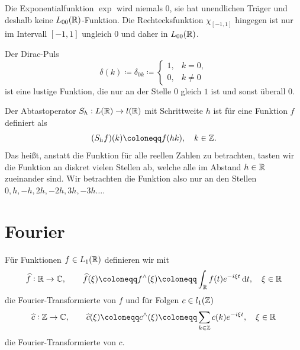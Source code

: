 \begin{example}[$ L_{00}(\R) $-Funktion]
Die Exponentialfunktion $ \exp $ wird niemals $ 0 $, sie hat unendlichen Träger und
deshalb keine $ L_{00}(\R) $-Funktion. Die Rechtecksfunktion $ \chi_{[-1,1]} $ hingegen ist nur
im Intervall $ [-1,1] $ ungleich $ 0 $ und daher in $ L_{00}(\R) $.
\end{example}

\begin{definition}
Der Dirac-Puls
\[
  \delta(k) \coloneqq \delta_{0k} \coloneqq 
  \begin{cases}
    1,& k = 0, \\ 0,& k \neq 0
  \end{cases}
\]
ist eine lustige Funktion, die nur an der Stelle $ 0 $ gleich $ 1 $ ist und sonst überall $ 0 $.
\end{definition}

\begin{definition}[Abtastoperator]
Der Abtastoperator $  S_{h} : L(\mathbb{R}) \rightarrow l(\mathbb{R}) $ mit Schrittweite $ h $ ist für eine
Funktion $ f $ definiert als
\[
  (S_{h}f)(k) \coloneqq f(hk), \quad k \in \Z.
\]
Das heißt, anstatt die Funktion für alle reellen Zahlen zu betrachten, tasten wir die Funktion
an diskret vielen Stellen ab, welche alle im Abstand $ h \in \mathbb{R} $ zueinander sind. Wir betrachten
die Funktion also nur an den Stellen $ 0, h, -h, 2h, -2h, 3h, -3h \dots $.
\end{definition}

\section{Fourier}

\begin{definition}
Für Funktionen $ f \in L_{1}(\mathbb{R}) $ definieren wir mit
\[
  \widehat{f} : \R \rightarrow \C, \qquad
  \widehat{f}(\xi) \coloneqq f^{\wedge}(\xi) \coloneqq 
  \int_{\R} f(t) e^{-i\xi t} \dif t, \quad \xi \in \R
\]
die Fourier-Transformierte von $ f $ und für Folgen $ c \in l_{1}(\mathbb{Z}) $
\[
  \widehat{c} : \Z \rightarrow \C, \qquad
  \widehat{c}(\xi) \coloneqq c^{\wedge}(\xi) \coloneqq 
  \sum_{k \in \Z} c(k) e^{-i\xi t}, \quad \xi \in \R
\]
die Fourier-Transformierte von $ c $.
\end{definition}

